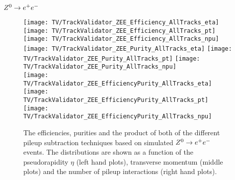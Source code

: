 \subsubsection{$\Zz\rightarrow\EE$ \label{sec:TASEFRDACPZEE}}

\begin{figure}[Ht]
    \centering
    \texttt{[image: TV/TrackValidator\_ZEE\_Efficiency\_AllTracks\_eta]}
    \texttt{[image: TV/TrackValidator\_ZEE\_Efficiency\_AllTracks\_pt]}
    \texttt{[image: TV/TrackValidator\_ZEE\_Efficiency\_AllTracks\_npu]}
    \\
    \texttt{[image: TV/TrackValidator\_ZEE\_Purity\_AllTracks\_eta]}
    \texttt{[image: TV/TrackValidator\_ZEE\_Purity\_AllTracks\_pt]}
    \texttt{[image: TV/TrackValidator\_ZEE\_Purity\_AllTracks\_npu]}
    \\
    \texttt{[image: TV/TrackValidator\_ZEE\_EfficiencyPurity\_AllTracks\_eta]}
    \texttt{[image: TV/TrackValidator\_ZEE\_EfficiencyPurity\_AllTracks\_pt]}
    \texttt{[image: TV/TrackValidator\_ZEE\_EfficiencyPurity\_AllTracks\_npu]}
    \caption[Efficiencies, purities and their product of the different pileup subtraction techniques based on simulated $\Zz\rightarrow\EE$ events]{The efficiencies, purities and the product of both of the different pileup subtraction techniques based on simulated $\Zz\rightarrow\EE$ events. The distributions are shown as a function of the pseudorapidity $\eta$ (left hand plots), transverse momentum (middle plots) and the number of pileup interactions (right hand plots). \label{plot:TACOAACPZEESignal}}
\end{figure}

